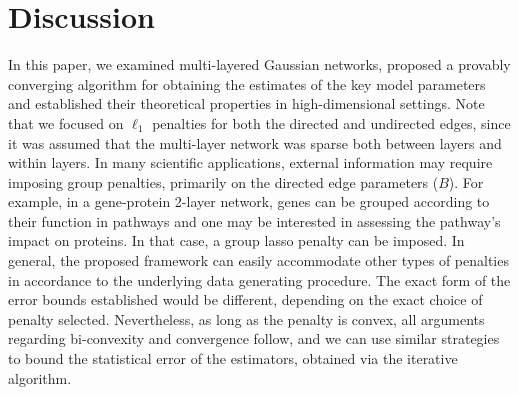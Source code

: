 \section{Discussion}\label{sec:grouping}

In this paper, we examined multi-layered Gaussian networks, proposed a provably converging algorithm for obtaining 
the estimates of the key model parameters and established their theoretical properties in  high-dimensional settings.
Note that we focused on $\ell_1$ penalties for both the directed and undirected edges, since it was assumed that the multi-layer network was sparse both between layers and within layers. In many scientific applications, external information may require
imposing group penalties, primarily on the directed edge parameters ($B$). For example, in a gene-protein 2-layer network, genes
can be grouped according to their function in pathways and one may be interested in assessing the pathway's impact on proteins.
In that case, a group lasso penalty can be imposed. In general, the proposed framework can easily accommodate 
other types of penalties in accordance to the underlying data generating procedure. The exact form of the error bounds
established would be different, depending on the exact choice of penalty selected. Nevertheless, as long as the penalty is convex, all arguments regarding bi-convexity and convergence follow, and we can use similar strategies to bound the statistical error of the estimators, obtained via the iterative algorithm.

